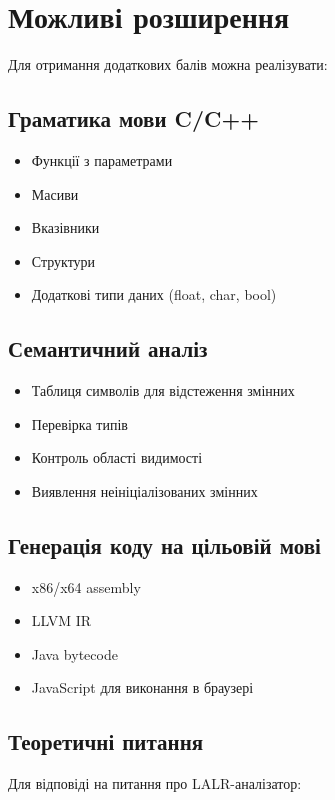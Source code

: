 \documentclass[12pt,a4paper]{article}
\begin{document}
\section{Можливі розширення}

Для отримання додаткових балів можна реалізувати:

\subsection{Граматика мови C/C++}
\begin{itemize}
    \item Функції з параметрами
    \item Масиви
    \item Вказівники
    \item Структури
    \item Додаткові типи даних (float, char, bool)
\end{itemize}

\subsection{Семантичний аналіз}
\begin{itemize}
    \item Таблиця символів для відстеження змінних
    \item Перевірка типів
    \item Контроль області видимості
    \item Виявлення неініціалізованих змінних
\end{itemize}

\subsection{Генерація коду на цільовій мові}
\begin{itemize}
    \item x86/x64 assembly
    \item LLVM IR
    \item Java bytecode
    \item JavaScript для виконання в браузері
\end{itemize}

\subsection{Теоретичні питання}

Для відповіді на питання про LALR-аналізатор:
\end{document}
